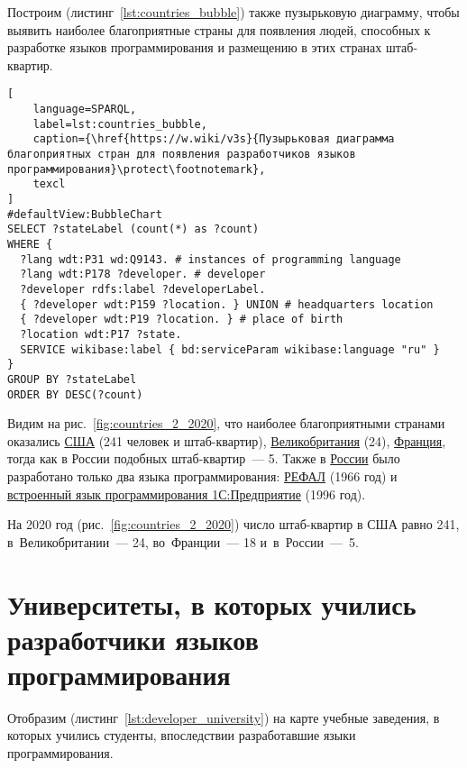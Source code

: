 Построим (листинг~\ref{lst:countries_bubble}) также пузырьковую диаграмму, чтобы выявить наиболее благоприятные страны для появления людей, способных к разработке языков программирования и размещению в этих странах штаб-квартир. 
\begin{lstlisting}[
	language=SPARQL,
	label=lst:countries_bubble,
	caption={\href{https://w.wiki/v3s}{Пузырьковая диаграмма благоприятных стран для появления разработчиков языков программирования}\protect\footnotemark},
	texcl
]
#defaultView:BubbleChart
SELECT ?stateLabel (count(*) as ?count)
WHERE {
  ?lang wdt:P31 wd:Q9143. # instances of programming language
  ?lang wdt:P178 ?developer. # developer
  ?developer rdfs:label ?developerLabel. 
  { ?developer wdt:P159 ?location. } UNION # headquarters location
  { ?developer wdt:P19 ?location. } # place of birth
  ?location wdt:P17 ?state.
  SERVICE wikibase:label { bd:serviceParam wikibase:language "ru" } 	
}
GROUP BY ?stateLabel
ORDER BY DESC(?count)
\end{lstlisting}

Видим на рис.~\ref{fig:countries_2_2020}, что наиболее благоприятными странами оказались \href{https://en.wikipedia.org/wiki/USA}{США} (241 человек и штаб-квартир), \href{https://ru.wikipedia.org/wiki/Великобритания}{Великобритания} (24), \href{https://ru.wikipedia.org/wiki/Франция}{Франция}, тогда как в России подобных штаб-квартир~--- 5. Также в \href{https://en.wikipedia.org/wiki/Russia}{России} было разработано только два языка программирования: \href{https://www.wikidata.org/wiki/Q2626418}{РЕФАЛ} (1966 год) и \href{https://www.wikidata.org/wiki/Q65065977}{встроенный язык программирования 1С:Предприятие} (1996 год).

На 2020 год (рис.~\ref{fig:countries_2_2020}) число штаб-квартир в США равно 241, 
в~Великобритании~--- 24, во~Франции~--- 18 и~в~России~---~5.







\newpage
\section{Университеты, в которых учились разработчики языков программирования}
Отобразим (листинг~\ref{lst:developer_university}) на карте учебные заведения, в которых учились студенты, впоследствии разработавшие языки программирования.

